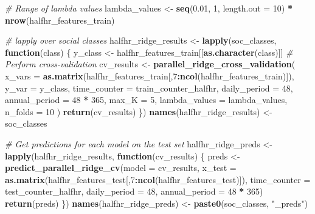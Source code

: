 \documentclass[
]{article}
\newenvironment{Shaded}{\begin{snugshade}}{\end{snugshade}}
\newcommand{\AttributeTok}[1]{\textcolor[rgb]{0.13,0.29,0.53}{#1}}
\newcommand{\CommentTok}[1]{\textcolor[rgb]{0.56,0.35,0.01}{\textit{#1}}}
\newcommand{\ControlFlowTok}[1]{\textcolor[rgb]{0.13,0.29,0.53}{\textbf{#1}}}
\newcommand{\DecValTok}[1]{\textcolor[rgb]{0.00,0.00,0.81}{#1}}
\newcommand{\FloatTok}[1]{\textcolor[rgb]{0.00,0.00,0.81}{#1}}
\newcommand{\FunctionTok}[1]{\textcolor[rgb]{0.13,0.29,0.53}{\textbf{#1}}}
\newcommand{\NormalTok}[1]{#1}
\newcommand{\OtherTok}[1]{\textcolor[rgb]{0.56,0.35,0.01}{#1}}
\newcommand{\SpecialCharTok}[1]{\textcolor[rgb]{0.81,0.36,0.00}{\textbf{#1}}}
\newcommand{\StringTok}[1]{\textcolor[rgb]{0.31,0.60,0.02}{#1}}
\begin{document}
\begin{Shaded}
\begin{Highlighting}[]
\CommentTok{\# Range of lambda values}
\NormalTok{lambda\_values }\OtherTok{\textless{}{-}} \FunctionTok{seq}\NormalTok{(}\FloatTok{0.01}\NormalTok{, }\DecValTok{1}\NormalTok{, }\AttributeTok{length.out =} \DecValTok{10}\NormalTok{) }\SpecialCharTok{*} \FunctionTok{nrow}\NormalTok{(halfhr\_features\_train)}

\CommentTok{\# lapply over social classes}
\NormalTok{halfhr\_ridge\_results }\OtherTok{\textless{}{-}} \FunctionTok{lapply}\NormalTok{(soc\_classes, }\ControlFlowTok{function}\NormalTok{(class) \{}
\NormalTok{  y\_class }\OtherTok{\textless{}{-}}\NormalTok{ halfhr\_features\_train[[}\FunctionTok{as.character}\NormalTok{(class)]]}
  \CommentTok{\# Perform cross{-}validation}
\NormalTok{  cv\_results }\OtherTok{\textless{}{-}} \FunctionTok{parallel\_ridge\_cross\_validation}\NormalTok{(}
    \AttributeTok{x\_vars =} \FunctionTok{as.matrix}\NormalTok{(halfhr\_features\_train[,}\DecValTok{7}\SpecialCharTok{:}\FunctionTok{ncol}\NormalTok{(halfhr\_features\_train)]), }
    \AttributeTok{y\_var =}\NormalTok{ y\_class,}
    \AttributeTok{time\_counter =}\NormalTok{ train\_counter\_halfhr, }
    \AttributeTok{daily\_period =} \DecValTok{48}\NormalTok{,}
    \AttributeTok{annual\_period =} \DecValTok{48} \SpecialCharTok{*} \DecValTok{365}\NormalTok{,}
    \AttributeTok{max\_K =} \DecValTok{5}\NormalTok{,}
    \AttributeTok{lambda\_values =}\NormalTok{ lambda\_values,}
    \AttributeTok{n\_folds =} \DecValTok{10}
\NormalTok{  )}
  \FunctionTok{return}\NormalTok{(cv\_results)}
\NormalTok{\})}
\FunctionTok{names}\NormalTok{(halfhr\_ridge\_results) }\OtherTok{\textless{}{-}}\NormalTok{ soc\_classes}

\CommentTok{\# Get predictions for each model on the test set}
\NormalTok{halfhr\_ridge\_preds }\OtherTok{\textless{}{-}} \FunctionTok{lapply}\NormalTok{(halfhr\_ridge\_results, }\ControlFlowTok{function}\NormalTok{(cv\_results) \{}
\NormalTok{  preds }\OtherTok{\textless{}{-}} \FunctionTok{predict\_parallel\_ridge\_cv}\NormalTok{(}\AttributeTok{model =}\NormalTok{ cv\_results,}
                                     \AttributeTok{x\_test =} \FunctionTok{as.matrix}\NormalTok{(halfhr\_features\_test[,}\DecValTok{7}\SpecialCharTok{:}\FunctionTok{ncol}\NormalTok{(halfhr\_features\_test)]),}
                                     \AttributeTok{time\_counter =}\NormalTok{ test\_counter\_halfhr,}
                                     \AttributeTok{daily\_period =} \DecValTok{48}\NormalTok{,}
                                     \AttributeTok{annual\_period =} \DecValTok{48} \SpecialCharTok{*} \DecValTok{365}\NormalTok{)}
  \FunctionTok{return}\NormalTok{(preds)}
\NormalTok{\})}
\FunctionTok{names}\NormalTok{(halfhr\_ridge\_preds) }\OtherTok{\textless{}{-}} \FunctionTok{paste0}\NormalTok{(soc\_classes, }\StringTok{"\_preds"}\NormalTok{)}
\end{Highlighting}
\end{Shaded}
\end{document}
